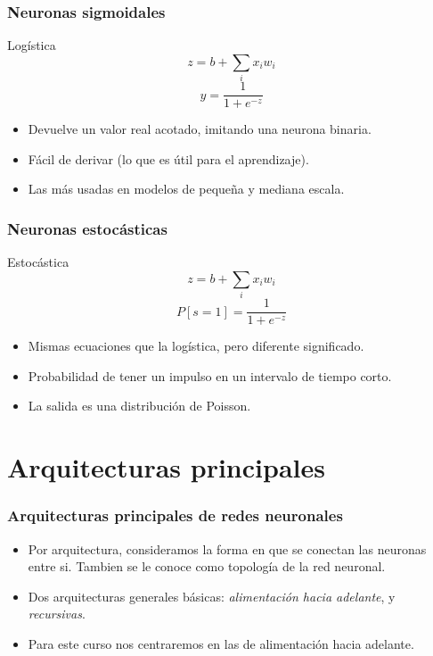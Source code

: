 \documentclass{beamer}
\begin{document}
\begin{frame}
 \frametitle{Neuronas sigmoidales}
  \begin{block}{Logística}
      $$ z = b + \sum_{i} x_i w_i $$
      $$ y = \frac{1}{1 + e^{-z}}$$
  \end{block}
  
  \begin{itemize}
  \item Devuelve un valor real acotado, imitando una neurona binaria.
  \item Fácil de derivar (lo que es útil para el aprendizaje).
  \item Las más usadas en modelos de pequeña y mediana escala.
  \end{itemize}
\end{frame}

\begin{frame}
 \frametitle{Neuronas estocásticas}
  \begin{block}{Estocástica}
      $$ z = b + \sum_{i} x_i w_i $$
      $$ P[s=1] = \frac{1}{1 + e^{-z}}$$
  \end{block}
  
  \begin{itemize}
  \item Mismas ecuaciones que la logística, pero diferente significado.
  \item Probabilidad de tener un impulso en un intervalo de tiempo corto.
  \item La salida es una distribución de Poisson.
  \end{itemize}
\end{frame}




\section{Arquitecturas principales}

\begin{frame}
  \frametitle{Arquitecturas principales de redes neuronales}
  \begin{itemize}
  \item Por arquitectura, consideramos la forma en que se conectan las
    neuronas entre si. Tambien se le conoce como \alert{topología} de
    la red neuronal.
  \item Dos arquitecturas generales básicas: \emph{alimentación hacia
      adelante}, y \emph{recursivas}.
  \item Para este curso nos centraremos en las de alimentación hacia adelante.
  \end{itemize}
\end{frame}
\end{document}
